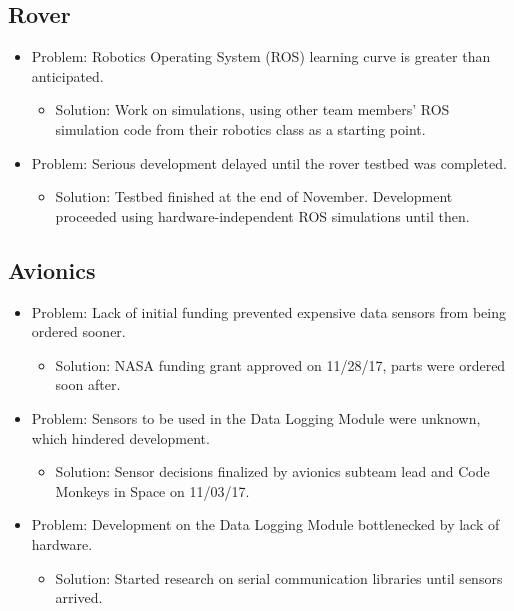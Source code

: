 \documentclass[onecolumn, draftclsnofoot,10pt, compsoc]{IEEEtran}
\begin{document}
\subsection{Rover}

\begin{itemize}
\item Problem: Robotics Operating System (ROS) learning curve is greater than anticipated.
\begin{itemize}
\item Solution: Work on simulations, using other team members' ROS simulation code from their robotics class as a starting point.
\end{itemize}
\item Problem: Serious development delayed until the rover testbed was completed.
\begin{itemize}
\item Solution: Testbed finished at the end of November. Development proceeded using hardware-independent ROS simulations until then.
\end{itemize}
\end{itemize}
\subsection{Avionics}
\begin{itemize}
\item Problem: Lack of initial funding prevented expensive data sensors from being ordered sooner.
\begin{itemize}
\item Solution: NASA funding grant approved on 11/28/17, parts were ordered soon after.
\end{itemize}
\item Problem: Sensors to be used in the Data Logging Module were unknown, which hindered development.
\begin{itemize}
\item Solution: Sensor decisions finalized by avionics subteam lead and Code Monkeys in Space on 11/03/17.
\end{itemize}
\item Problem: Development on the Data Logging Module bottlenecked by lack of hardware.
\begin{itemize}
\item Solution: Started research on serial communication libraries until sensors arrived.
\end{itemize}
\end{itemize}
\end{document}
